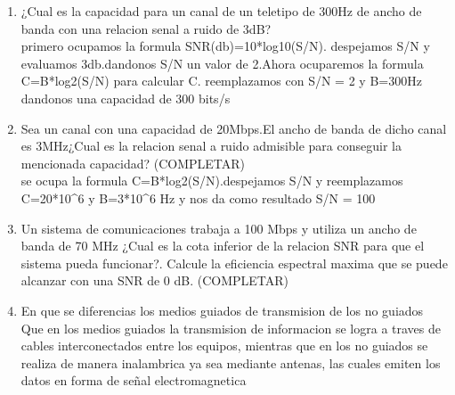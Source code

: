 \documentclass{udparticle}
\begin{document}
\begin{enumerate}
    \item  ¿Cual es la capacidad para un canal de un teletipo de 300Hz de ancho de banda con una relacion senal a ruido de 3dB? \\
    		primero ocupamos la formula SNR(db)=10*log10(S/N). despejamos S/N y evaluamos 3db.dandonos S/N un valor de 2.Ahora 
    		ocuparemos la formula C=B*log2(S/N) para calcular C. reemplazamos con S/N = 2 y B=300Hz dandonos una capacidad 
    		de 300 bits/s
    \item Sea un canal con una capacidad de 20Mbps.El ancho de banda de dicho canal es 3MHz¿Cual es la relacion senal a ruido 
    	  admisible para conseguir la mencionada capacidad? (COMPLETAR)\\
    	 	se ocupa la formula C=B*log2(S/N).despejamos S/N y reemplazamos C=20*10^6 y  B=3*10^6 Hz y nos da como resultado 
    	 	S/N = 100
    \item  Un sistema de comunicaciones trabaja a 100 Mbps y utiliza un ancho de banda de 70 MHz ¿Cual es la cota inferior de la relacion SNR para que el sistema pueda funcionar?. Calcule la eﬁciencia espectral maxima que se puede alcanzar con una SNR de 0 dB. (COMPLETAR)\\
    \item En que se diferencias los medios guiados de transmision de los no guiados\\
    Que en los medios guiados la transmision de informacion se logra a traves de cables interconectados entre los equipos, 
    mientras que en los no guiados se realiza de manera inalambrica ya sea mediante antenas, las cuales emiten los datos en forma de 
    señal electromagnetica\\
    

\end{enumerate}
\end{document}
